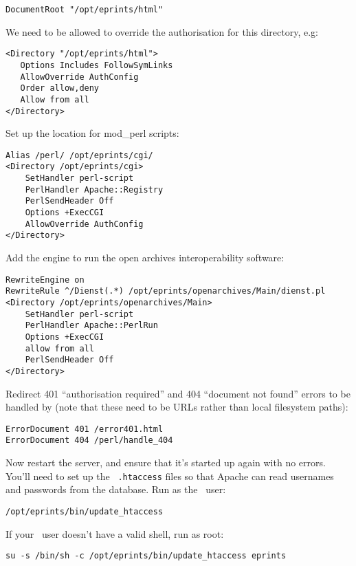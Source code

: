 \begin{verbatim}
DocumentRoot "/opt/eprints/html"
\end{verbatim}

We need to be allowed to override the authorisation for this directory, e.g:

\begin{verbatim}
<Directory "/opt/eprints/html">
   Options Includes FollowSymLinks
   AllowOverride AuthConfig
   Order allow,deny
   Allow from all
</Directory>
\end{verbatim}

Set up the location for mod\_perl scripts:

\begin{verbatim}
Alias /perl/ /opt/eprints/cgi/
<Directory /opt/eprints/cgi>
    SetHandler perl-script
    PerlHandler Apache::Registry
    PerlSendHeader Off
    Options +ExecCGI
    AllowOverride AuthConfig
</Directory>
\end{verbatim}

Add the engine to run the open archives interoperability software:

\begin{verbatim}
RewriteEngine on
RewriteRule ^/Dienst(.*) /opt/eprints/openarchives/Main/dienst.pl
<Directory /opt/eprints/openarchives/Main>
    SetHandler perl-script
    PerlHandler Apache::PerlRun
    Options +ExecCGI
    allow from all
    PerlSendHeader Off
</Directory>
\end{verbatim}

Redirect 401 ``authorisation required'' and 404 ``document not found'' errors to be handled by \eprints (note that these need to be URLs rather than local filesystem paths):

\begin{verbatim}
ErrorDocument 401 /error401.html
ErrorDocument 404 /perl/handle_404
\end{verbatim}

Now restart the server, and ensure that it's started up again with no errors. You'll need to set up the \eprints\ {\tt .htaccess} files so that Apache can read usernames and passwords from the database. Run as the \eprints\ user:

\begin{verbatim}
/opt/eprints/bin/update_htaccess
\end{verbatim}

If your \eprints\ user doesn't have a valid shell, run as root:

\begin{verbatim}
su -s /bin/sh -c /opt/eprints/bin/update_htaccess eprints
\end{verbatim}


